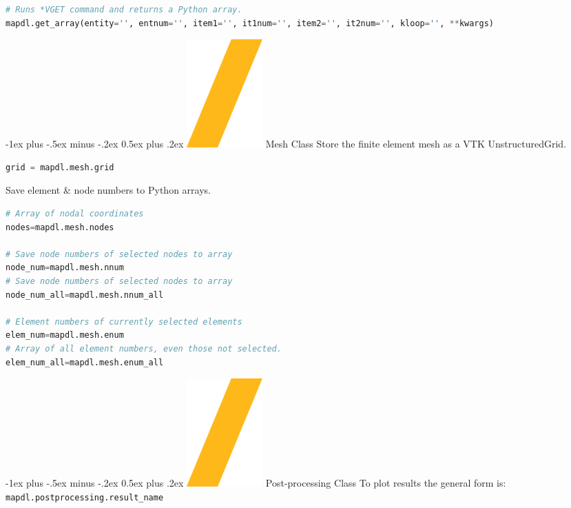 \documentclass[9pt,landscape]{article}
\makeatletter
\renewcommand{\section}{\@startsection{section}{1}{0mm}%
                                {-1ex plus -.5ex minus -.2ex}%
                                {0.5ex plus .2ex}%
                                {\normalfont\large\bfseries}}
\def\code#1{\texttt{#1}}
\makeatother
\begin{document}
\begin{multicols}{3}
\begin{lstlisting}[language=Python]
# Runs *VGET command and returns a Python array.
mapdl.get_array(entity='', entnum='', item1='', it1num='', item2='', it2num='', kloop='', **kwargs)
\end{lstlisting}
\vfill

\section{\includegraphics[height=\fontcharht\font`\S]{slash.png} Mesh Class}
Store the finite element mesh as a VTK UnstructuredGrid.
\begin{lstlisting}[language=Python]
grid = mapdl.mesh.grid
\end{lstlisting}

Save element \& node numbers to Python arrays.
\begin{lstlisting}[language=Python]
# Array of nodal coordinates
nodes=mapdl.mesh.nodes

# Save node numbers of selected nodes to array
node_num=mapdl.mesh.nnum
# Save node numbers of selected nodes to array
node_num_all=mapdl.mesh.nnum_all

# Element numbers of currently selected elements
elem_num=mapdl.mesh.enum
# Array of all element numbers, even those not selected.
elem_num_all=mapdl.mesh.enum_all
\end{lstlisting}
\vfill

\columnbreak

\section{\includegraphics[height=\fontcharht\font`\S]{slash.png} Post-processing Class}
To plot results the general form is: \code{mapdl.postprocessing.result\_name}


\end{multicols}
\end{document}
